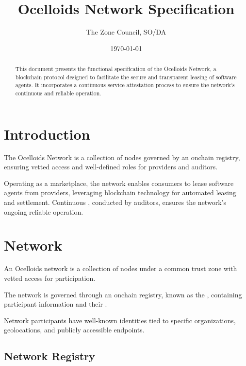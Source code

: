\documentclass{oc}
\begin{document}
\title{Ocelloids Network Specification}
\author{The Zone Council, SO/DA}
\date{\today}
\maketitle

\begin{abstract}
This document presents the functional specification of the Ocelloids Network,
a blockchain protocol designed to facilitate the secure and transparent leasing of software agents.
It incorporates a continuous service attestation process to ensure the network's continuous and reliable operation.
\end{abstract}

\newpage

\tableofcontents

\newpage

\section{Introduction}\label{sec:introduction}

The Ocelloids Network is a collection of nodes governed by an onchain registry, ensuring vetted access and well-defined roles for \glspl{provider} and \glspl{auditor}.

Operating as a marketplace, the network enables \glspl{consumer} to lease software \glspl{agent} from \glspl{provider}, leveraging blockchain technology for automated leasing and settlement.
Continuous , conducted by \glspl{auditor}, ensures the network's ongoing reliable operation.

\section{Network}

An Ocelloids network is a collection of nodes under a common trust zone with vetted access for participation.

The network is governed through an onchain registry, known as the , containing participant information and their .

Network participants have well-known identities tied to specific organizations, geolocations, and publicly accessible endpoints.

\subsection{Network Registry}\label{sec:network-registry}
\end{document}

